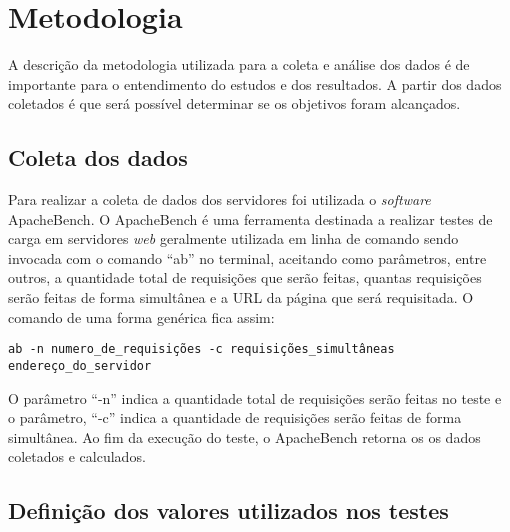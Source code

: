 \chapter{Metodologia}\label{cap:metodologia}

A descrição da metodologia utilizada para a coleta e análise dos dados é de 
importante para o entendimento do estudos e dos resultados. A partir dos dados 
coletados é que será possível determinar se os objetivos foram alcançados.

\section{Coleta dos dados}

Para realizar a coleta de dados dos servidores foi utilizada o 
\textit{software} ApacheBench. O ApacheBench é uma ferramenta destinada a 
realizar testes de carga em servidores \textit{web} geralmente utilizada em 
linha de comando sendo invocada com o comando ``ab'' no terminal, aceitando 
como parâmetros, entre outros, a quantidade total de requisições que serão 
feitas, quantas requisições serão feitas de forma simultânea e a URL da página 
que será requisitada. O comando de uma forma genérica fica assim:

\begin{verbatim}
ab -n numero_de_requisições -c requisições_simultâneas endereço_do_servidor
\end{verbatim}

O parâmetro ``-n'' indica a quantidade total de requisições serão feitas no 
teste e o parâmetro, ``-c'' indica a quantidade de requisições serão feitas de 
forma simultânea. Ao fim da execução do teste, o ApacheBench retorna os os 
dados coletados e calculados.



\section{Definição dos valores utilizados nos testes}

